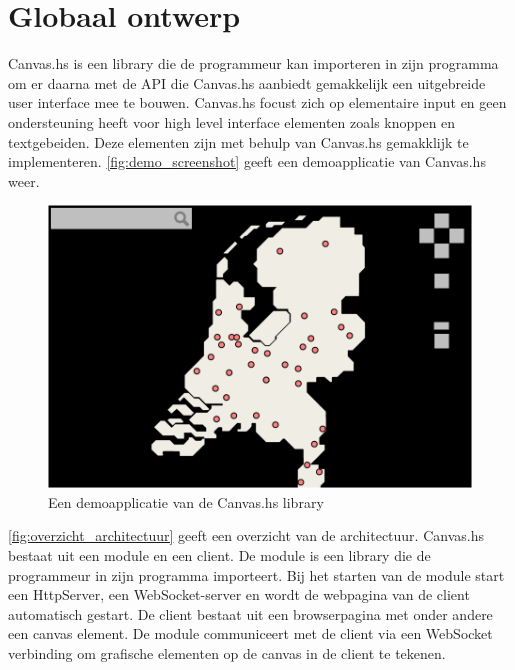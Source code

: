 \section{Globaal ontwerp}  \label{sec:globaal}
Canvas.hs is een library die de programmeur kan importeren in zijn programma om er daarna met de API die Canvas.hs aanbiedt gemakkelijk een uitgebreide user interface mee te bouwen. Canvas.hs focust zich op elementaire input en geen ondersteuning heeft voor high level interface elementen zoals knoppen en textgebeiden. Deze elementen zijn met behulp van Canvas.hs gemakklijk te implementeren. \autoref{fig:demo_screenshot} geeft een demoapplicatie van Canvas.hs weer.


\begin{figure}[H]
\begin{center}
\includegraphics[keepaspectratio,width=\textwidth]{./images/demo.png}
\caption{Een demoapplicatie van de Canvas.hs library}
\label{fig:demo_screenshot}
\end{center}
\end{figure}


\autoref{fig:overzicht_architectuur} geeft een overzicht van de architectuur. Canvas.hs bestaat uit een module en een client. De module is een library die de programmeur in zijn programma importeert. Bij het starten van de module start een HttpServer, een WebSocket-server en wordt de webpagina van de client automatisch gestart. De client bestaat uit een browserpagina met onder andere een canvas element. De module communiceert met de client via een WebSocket verbinding om grafische elementen op de canvas in de client te tekenen.

